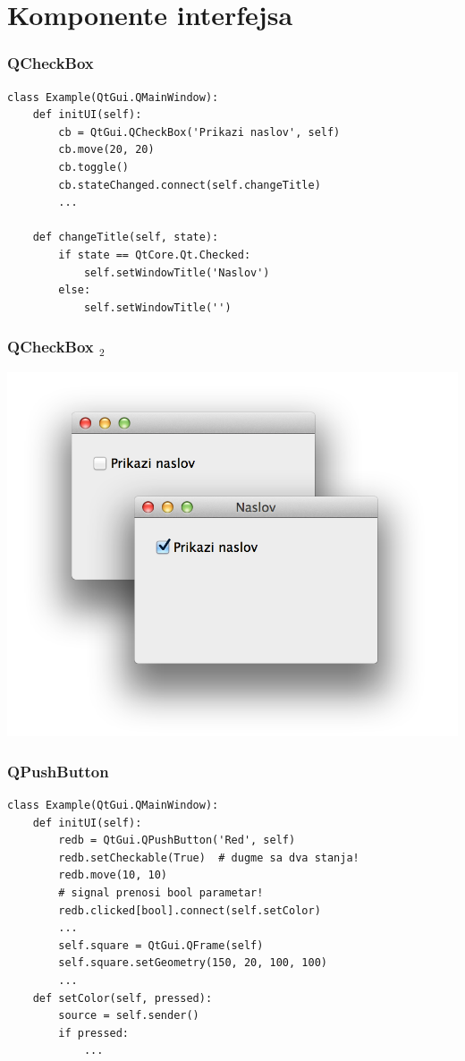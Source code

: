\documentclass[utf8,compress]{beamer}
\begin{document}
\section[Widgets]{Komponente interfejsa}

\begin{frame}[fragile]
  \frametitle{QCheckBox}
\begin{verbatim}
class Example(QtGui.QMainWindow):
    def initUI(self):
        cb = QtGui.QCheckBox('Prikazi naslov', self)
        cb.move(20, 20)
        cb.toggle()
        cb.stateChanged.connect(self.changeTitle)
        ...
        
    def changeTitle(self, state):      
        if state == QtCore.Qt.Checked:
            self.setWindowTitle('Naslov')
        else:
            self.setWindowTitle('')
\end{verbatim}
\end{frame}

\begin{frame}[fragile]
  \frametitle{QCheckBox $_2$}
\begin{center}
\includegraphics[scale=0.25]{pyqt12.png}
\end{center}
\end{frame}

\begin{frame}
  \frametitle{QPushButton}
\begin{verbatim}
class Example(QtGui.QMainWindow):
    def initUI(self):
        redb = QtGui.QPushButton('Red', self)
        redb.setCheckable(True)  # dugme sa dva stanja!
        redb.move(10, 10)
        # signal prenosi bool parametar!
        redb.clicked[bool].connect(self.setColor)
        ...
        self.square = QtGui.QFrame(self)
        self.square.setGeometry(150, 20, 100, 100)
        ...
    def setColor(self, pressed):
        source = self.sender()
        if pressed:
            ...
\end{verbatim}
\end{frame}
\end{document}
